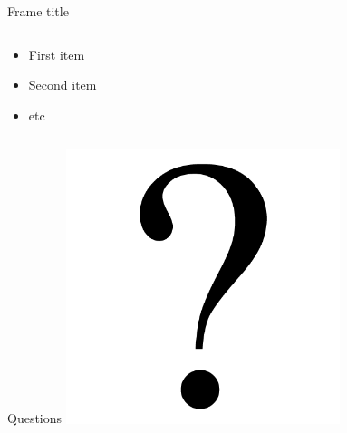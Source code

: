 \documentclass{beamer}
\begin{document}
\begin{frame}{Frame title}

\begin{columns}
    \begin{column}{.5\textwidth}
        \begin{itemize}
            \item<1-> First item
            \item<2-> Second item
            \item<3-> etc
        \end{itemize}
    \end{column}
    \begin{column}{.5\textwidth}
    \end{column}
\end{columns}
    
\end{frame}

\begin{frame}{Questions}
    \centering
    \includegraphics[width=0.6\textwidth]{img/questionmark.png}
\end{frame}
\end{document}
